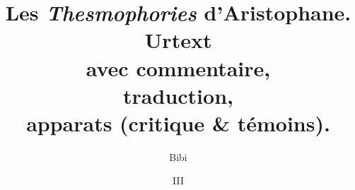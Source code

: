 \documentclass[12pt]{book}%
\newcommand{\italique}[1]{\textit{#1}}%
\newcommand{\francais}[1]{{\policeFr #1}}%
\newcommand{\latin}[1]{{\policeLat #1}}%
\newcommand{\allemand}[1]{{\policeAll #1}}%
\newcommand{\grec}[1]{#1}%
\newcommand{\anglais}[1]{{\policeAn #1}}%
\newcommand{\italien}[1]{{\policeIt #1}}%
\newcommand{\espagnol}[1]{{\policeEsp #1}}%
\begin{document}
 
\title{Les \italique{Thesmophories} d'Aristophane.\\
\allemand{Urtext}\\
avec commentaire,\\
traduction,\\
apparats (critique \& témoins).}
\author{Bibi}
\date{III }

\maketitle
\end{document}
